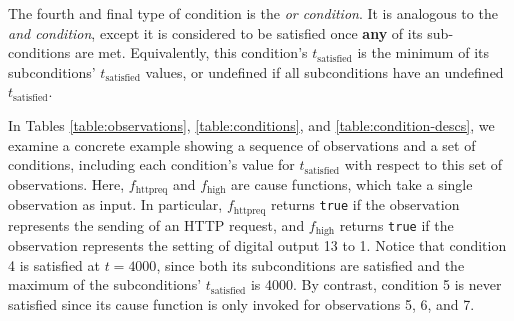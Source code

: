\documentclass[12pt]{article}
\begin{document}
The fourth and final type of condition is the \textit{or condition}.  It is analogous to the \textit{and condition}, except it is considered to be satisfied once \textbf{any} of its sub-conditions are met. Equivalently, this condition's $t_{\text{satisfied}}$ is the minimum of its subconditions' $t_{\text{satisfied}}$ values, or undefined if all subconditions have an undefined $t_{\text{satisfied}}$.

In Tables \ref{table:observations}, \ref{table:conditions}, and \ref{table:condition-descs}, we examine a concrete example showing a sequence of observations and a set of conditions, including each condition's value for $t_{\text{satisfied}}$ with respect to this set of observations.  Here, $f_{\text{httpreq}}$ and $f_{\text{high}}$ are cause functions, which take a single observation as input.  In particular, $f_{\text{httpreq}}$ returns \texttt{true} if the observation represents the sending of an HTTP request, and $f_{\text{high}}$ returns \texttt{true} if the observation represents the setting of digital output 13 to 1.  Notice that condition 4 is satisfied at $t=4000$, since both its subconditions are satisfied and the maximum of the subconditions' $t_{\text{satisfied}}$ is 4000.  By contrast, condition 5 is never satisfied since its cause function is only invoked for observations 5, 6, and 7.
\end{document}
